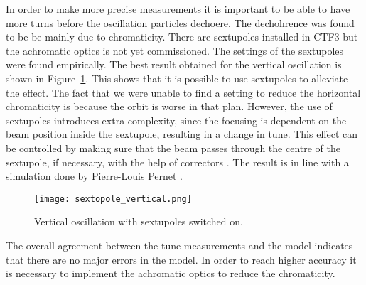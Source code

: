 In order to make more precise measurements it is important 
to be able to have more turns before the oscillation particles dechoere. 
The dechohrence was found to be be mainly due to chromaticity. 
There are sextupoles installed in CTF3 but the achromatic optics is not yet commissioned.
The settings of the sextupoles were found empirically. 
The best result obtained for the vertical oscillation is shown in 
Figure~\ref{fig:tune:sextopole_vertical}. 
This shows that it is possible to use sextupoles to alleviate the effect. 
The fact that we were unable to find a setting to reduce 
the horizontal chromaticity is because the orbit is worse in that plan. 
However, the use of sextupoles introduces extra complexity, 
since the focusing is dependent on the beam position inside the sextupole, 
resulting in a change in tune. 
This effect can be controlled by making sure that the beam passes through the centre of 
the sextupole, if necessary, with the help of correctors \cite{Minty_Zimmermann_Book}. 
The result is in line with a simulation done by Pierre-Louis Pernet \cite{pierre:tune}.    
 
\begin{figure}[!h]
\centering
\texttt{[image: sextopole\_vertical.png]}
\caption{Vertical oscillation with sextupoles switched on.  \label{fig:tune:sextopole_vertical}}
\end{figure}
 

The overall agreement between the tune measurements and 
the model indicates that there are no major errors in the model. 
In order to reach higher accuracy it is necessary to implement 
the achromatic optics to reduce the chromaticity.
 
